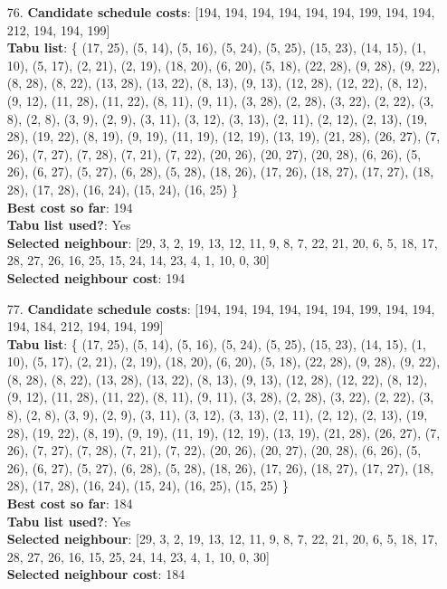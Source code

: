 \documentclass[fleqn]{article}
\begin{document}
\begin{itemize}
    \item[76.] \textbf{Candidate schedule costs}: [194, 194, 194, 194, 194, 194, 199, 194, 194, 212, 194, 194, 199] \\
    \textbf{Tabu list}: \{ (17, 25), (5, 14), (5, 16), (5, 24), (5, 25), (15, 23), (14, 15), (1, 10), (5, 17), (2, 21), (2, 19), (18, 20), (6, 20), (5, 18), (22, 28), (9, 28), (9, 22), (8, 28), (8, 22), (13, 28), (13, 22), (8, 13), (9, 13), (12, 28), (12, 22), (8, 12), (9, 12), (11, 28), (11, 22), (8, 11), (9, 11), (3, 28), (2, 28), (3, 22), (2, 22), (3, 8), (2, 8), (3, 9), (2, 9), (3, 11), (3, 12), (3, 13), (2, 11), (2, 12), (2, 13), (19, 28), (19, 22), (8, 19), (9, 19), (11, 19), (12, 19), (13, 19), (21, 28), (26, 27), (7, 26), (7, 27), (7, 28), (7, 21), (7, 22), (20, 26), (20, 27), (20, 28), (6, 26), (5, 26), (6, 27), (5, 27), (6, 28), (5, 28), (18, 26), (17, 26), (18, 27), (17, 27), (18, 28), (17, 28), (16, 24), (15, 24), (16, 25) \} \\
    \textbf{Best cost so far}: 194 \\
    \textbf{Tabu list used?}: Yes \\
    \textbf{Selected neighbour}: [29, 3, 2, 19, 13, 12, 11, 9, 8, 7, 22, 21, 20, 6, 5, 18, 17, 28, 27, 26, 16, 25, 15, 24, 14, 23, 4, 1, 10, 0, 30] \\
    \textbf{Selected neighbour cost}: 194
      

    \item[77.] \textbf{Candidate schedule costs}: [194, 194, 194, 194, 194, 194, 199, 194, 194, 194, 184, 212, 194, 194, 199] \\
    \textbf{Tabu list}: \{ (17, 25), (5, 14), (5, 16), (5, 24), (5, 25), (15, 23), (14, 15), (1, 10), (5, 17), (2, 21), (2, 19), (18, 20), (6, 20), (5, 18), (22, 28), (9, 28), (9, 22), (8, 28), (8, 22), (13, 28), (13, 22), (8, 13), (9, 13), (12, 28), (12, 22), (8, 12), (9, 12), (11, 28), (11, 22), (8, 11), (9, 11), (3, 28), (2, 28), (3, 22), (2, 22), (3, 8), (2, 8), (3, 9), (2, 9), (3, 11), (3, 12), (3, 13), (2, 11), (2, 12), (2, 13), (19, 28), (19, 22), (8, 19), (9, 19), (11, 19), (12, 19), (13, 19), (21, 28), (26, 27), (7, 26), (7, 27), (7, 28), (7, 21), (7, 22), (20, 26), (20, 27), (20, 28), (6, 26), (5, 26), (6, 27), (5, 27), (6, 28), (5, 28), (18, 26), (17, 26), (18, 27), (17, 27), (18, 28), (17, 28), (16, 24), (15, 24), (16, 25), (15, 25) \} \\
    \textbf{Best cost so far}: 184 \\
    \textbf{Tabu list used?}: Yes \\
    \textbf{Selected neighbour}: [29, 3, 2, 19, 13, 12, 11, 9, 8, 7, 22, 21, 20, 6, 5, 18, 17, 28, 27, 26, 16, 15, 25, 24, 14, 23, 4, 1, 10, 0, 30] \\
    \textbf{Selected neighbour cost}: 184
      


\end{itemize}
\end{document}
